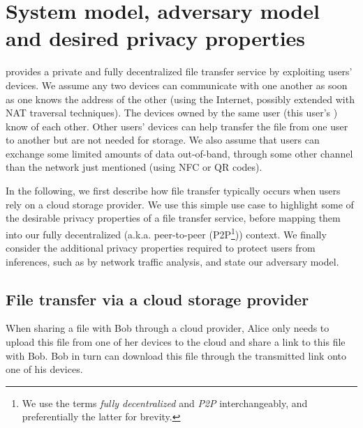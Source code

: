 

\section{System model, adversary model and desired privacy properties}%
\label{system-model}

\name provides a private and fully decentralized file transfer service by exploiting 
users' devices.  We assume any two devices can communicate with one
another as soon as one knows the address of the other (\eg using the
Internet, possibly extended with NAT traversal techniques). The
devices owned by the same user (this user's \squad) know of each
other. Other users' devices can help transfer the file from one user
to another but are not needed for storage.  We also assume that users
can exchange some limited amounts of data out-of-band, \ie through
some other channel than the network just mentioned (\eg using \ac{NFC}
or QR codes).



In the following, we first describe how file transfer typically occurs
when users rely on a cloud storage provider. We use this simple use
case to highlight some of the desirable privacy properties of a file
transfer service, before mapping them into our fully decentralized
(a.k.a. peer-to-peer (P2P\footnote{We use the terms \emph{fully decentralized} and
  \emph{P2P} interchangeably, and preferentially the latter for brevity.}))
context.  We finally consider the additional privacy properties
required to protect users from inferences, such as by network traffic
analysis, and state our adversary model.

\subsection{File transfer via a cloud storage provider}

When sharing a file with Bob through a cloud provider, Alice only
needs to upload this file from one of her devices to the cloud and
share a link to this file with Bob. Bob in turn can download this file
through the transmitted link onto one of his devices.

